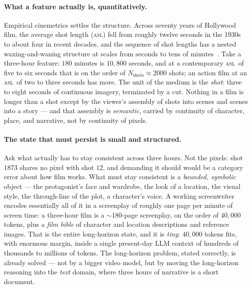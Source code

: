 \documentclass[11pt]{article}
\newcommand{\Nshots}{\ensuremath{N_{\mathrm{shots}}}}
\newcommand{\asl}{\textsc{asl}}
\begin{document}
\paragraph{What a feature actually is, quantitatively.} Empirical cinemetrics settles the structure. Across
seventy years of Hollywood film, the average shot length (\asl) fell from roughly twelve seconds in the 1930s to
about four in recent decades, and the sequence of shot lengths has a nested waxing-and-waning structure at
scales from seconds to tens of minutes~\cite{cutting}. Take a three-hour feature: $180$ minutes is $10{,}800$
seconds, and at a contemporary \asl\ of five to six seconds that is on the order of $\Nshots\approx 2000$ shots;
an action film at an \asl\ of two to three seconds has more. The unit of the medium is the \emph{shot}: three to
eight seconds of continuous imagery, terminated by a cut. Nothing in a film is longer than a shot except by the
viewer's assembly of shots into scenes and scenes into a story --- and that assembly is \emph{semantic}, carried
by continuity of character, place, and narrative, not by continuity of pixels.

\paragraph{The state that must persist is small and structured.} Ask what actually has to stay consistent across
three hours. Not the pixels: shot $1873$ shares no pixel with shot $12$, and demanding it should would be a
category error about how film works. What must stay consistent is a \emph{bounded, symbolic} object --- the
protagonist's face and wardrobe, the look of a location, the visual style, the through-line of the plot, a
character's voice. A working screenwriter encodes essentially all of it in a screenplay of roughly one page per
minute of screen time: a three-hour film is a $\sim$180-page screenplay, on the order of $40{,}000$ tokens,
plus a \emph{film bible} of character and location descriptions and reference images. That is the entire
long-horizon state, and it is \emph{tiny}: $40{,}000$ tokens fits, with enormous margin, inside a single
present-day LLM context of hundreds of thousands to millions of tokens. The long-horizon problem, stated
correctly, is already solved --- not by a bigger video model, but by moving the long-horizon reasoning into the
\emph{text} domain, where three hours of narrative is a short document.
\end{document}
